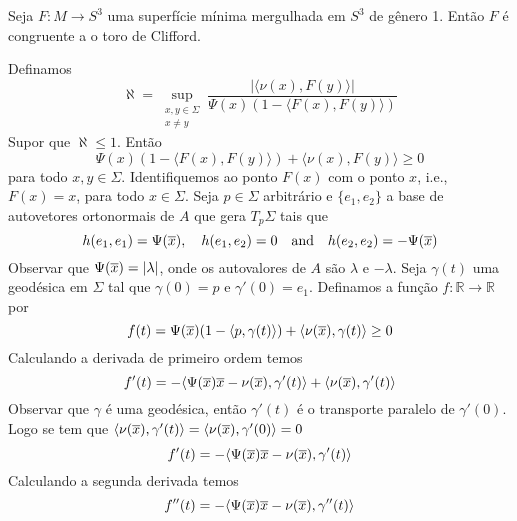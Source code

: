 \begin{teorema}[Brendle]
	Seja $F: M \rightarrow S^3$ uma superfície mínima mergulhada em $S^3$ de gênero 1. Então $F$ é congruente a o toro de Clifford.
\end{teorema}

Definamos
\begin{equation*}
	\aleph = \sup_{\substack{x,y \in \Sigma\\ x \neq y}} \frac{| \langle  \nu(x), F(y) \rangle |}{\Psi(x) (1 - \langle F(x), F(y) \rangle)}
\end{equation*}
Supor que $\aleph \leq 1$. Então
\begin{equation*}
	\Psi(x) (1 - \langle F(x), F(y) \rangle) + \langle \nu(x), F(y) \rangle \geq 0
\end{equation*}
para todo $ x,y \in \Sigma $. Identifiquemos ao ponto $F(x)$ com o ponto $x$, i.e., $F(x) = x$, para todo $x \in \Sigma$. Seja $p \in \Sigma$ arbitrário e $\{ e_1, e_2 \}$ a base de autovetores ortonormais de $A$ que gera $T_{p} \Sigma$ tais que
\begin{equation*}
	h(e_1,e_1) = \Psi(\overline{x}), \quad h(e_1,e_2)=0 \quad \text{and} \quad h(e_2,e_2) = -\Psi(\overline{x})
\end{equation*}
Observar que $\Psi(\overline{x}) = |\lambda|$, onde os autovalores de $A$ são $\lambda$ e $-\lambda$.
Seja $\gamma(t)$ uma geodésica em $\Sigma$ tal que $\gamma(0)=p$ e $\gamma'(0)=e_1$. Definamos a função $f: \mathbb{R} \rightarrow \mathbb{R}$ por
\begin{equation*}
	f(t) = \Psi(\overline{x}) (1 - \langle p, \gamma(t) \rangle) + \langle \nu(\overline{x}), \gamma(t) \rangle \geq 0
\end{equation*}
Calculando a derivada de primeiro ordem temos
\begin{equation*}
	f'(t) = -\langle \Psi(\overline{x}) \overline{x} - \nu(\overline{x}), \gamma'(t) \rangle + \langle \nu(\overline{x}), \gamma'(t) \rangle
\end{equation*}
Observar que $ \gamma $ é uma geodésica, então $ \gamma'(t) $ é  o transporte paralelo de $ \gamma'(0) $. Logo se tem que $ \langle \nu(\overline{x}), \gamma'(t) \rangle = \langle \nu(\overline{x}), \gamma'(0) \rangle = 0 $
\begin{equation*}
	f'(t) = -\langle \Psi(\overline{x}) \overline{x} - \nu(\overline{x}), \gamma'(t) \rangle
\end{equation*}
Calculando a segunda derivada temos
\begin{equation*}
	f''(t) = -\langle \Psi(\overline{x}) \overline{x} - \nu(\overline{x}), \gamma''(t) \rangle
\end{equation*}
